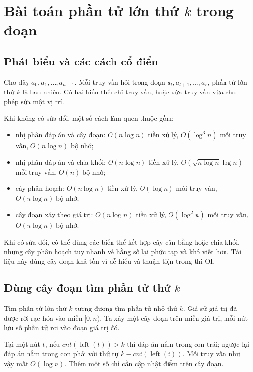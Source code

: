 \documentclass[11pt]{article}
\begin{document}
\section{\texorpdfstring{Bài toán phần tử lớn thứ $k$ trong đoạn}{Bài toán phần tử lớn thứ k trong đoạn}}

\subsection{Phát biểu và các cách cổ điển}

Cho dãy $a_0,a_1,\ldots,a_{n-1}$. Mỗi truy vấn hỏi trong đoạn
$a_l,a_{l+1},\ldots,a_r$, phần tử lớn thứ $k$ là bao nhiêu. Có hai
biến thể: chỉ truy vấn, hoặc vừa truy vấn vừa cho phép sửa một vị trí.

Khi không có sửa đổi, một số cách làm quen thuộc gồm:
\begin{itemize}
  \item nhị phân đáp án và cây đoạn:
  $O(n\log n)$ tiền xử lý, $O(\log^3 n)$ mỗi truy vấn, $O(n\log n)$ bộ nhớ;
  \item nhị phân đáp án và chia khối:
  $O(n\log n)$ tiền xử lý, $O(\sqrt{n\log n}\log n)$ mỗi truy vấn, $O(n)$ bộ nhớ;
  \item cây phân hoạch:
  $O(n\log n)$ tiền xử lý, $O(\log n)$ mỗi truy vấn, $O(n\log n)$ bộ nhớ;
  \item cây đoạn xây theo giá trị:
  $O(n\log n)$ tiền xử lý, $O(\log^2 n)$ mỗi truy vấn, $O(n\log n)$ bộ nhớ.
\end{itemize}

Khi có sửa đổi, có thể dùng các biến thể kết hợp cây cân bằng hoặc chia
khối, nhưng cây phân hoạch tuy nhanh về hằng số lại phức tạp và khó
viết hơn. Tài liệu này dùng cây đoạn khả tồn vì dễ hiểu và thuận tiện
trong thi OI.

\subsection{\texorpdfstring{Dùng cây đoạn tìm phần tử thứ $k$}{Dùng cây đoạn tìm phần tử thứ k}}

Tìm phần tử lớn thứ $k$ tương đương tìm phần tử nhỏ thứ $k$. Giả sử giá
trị đã được rời rạc hóa vào miền $[0,n)$. Ta xây một cây đoạn trên miền
giá trị, mỗi nút lưu số phần tử rơi vào đoạn giá trị đó.

Tại một nút $t$, nếu $cnt(\operatorname{left}(t))>k$ thì đáp án nằm
trong con trái; ngược lại đáp án nằm trong con phải với thứ tự
$k-cnt(\operatorname{left}(t))$. Mỗi truy vấn như vậy mất $O(\log n)$.
Thêm một số chỉ cần cập nhật điểm trên cây đoạn.
\end{document}
